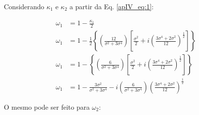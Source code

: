 Considerando $\kappa_{1}$ e $\kappa_{2}$ a partir da Eq. \ref{apIV_eq:1}:





\begin{align}
\label{apV_eq:24}
\omega_{1} & = 1 - \frac{\kappa_{1}}{2} \\
\label{apV_eq:25}
\omega_{1} & = 1 - \frac{1}{2} \left\lbrace \left( \frac{12}{\sigma^{2} + 3\sigma^{4}} \right) \left[ \frac{\sigma^{2}}{2} + i \left( \frac{3\sigma^{4} + 2\sigma^2}{12} \right)^\frac{1}{2} \right] \right\rbrace \\
\label{apV_eq:25.1}
\omega_{1} & = 1 - \left\lbrace \left( \frac{6}{\sigma^{2} + 3\sigma^{4}} \right) \left[ \frac{\sigma^{2}}{2} + i \left( \frac{3\sigma^{4} + 2\sigma^2}{12} \right)^\frac{1}{2} \right] \right\rbrace \\
\label{apV_eq:26}
\omega_{1} & = 1 - \frac{3\sigma^{2}}{\sigma^{2} + 3\sigma^{4}} - i \left( \frac{6}{\sigma^{2}+3\sigma^{4}} \right) \left( \frac{3\sigma^{4} + 2\sigma^2}{12} \right)^\frac{1}{2}
\end{align}

O mesmo pode ser feito para $\omega_{2}$:


